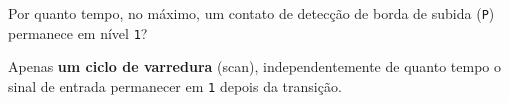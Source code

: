 \question[2] Por quanto tempo, no máximo, um contato de detecção de borda de subida (\texttt{P}) permanece em nível \texttt{1}?

\begin{solution}
Apenas \textbf{um ciclo de varredura} (scan), independentemente de quanto tempo o sinal de entrada permanecer em \texttt{1} depois da transição.
\end{solution}
